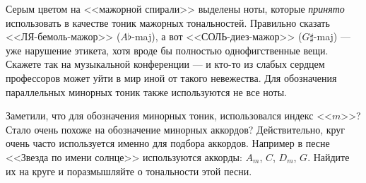 Серым цветом на <<мажорной спирали>> выделены ноты, которые \emph{принято} использовать в качестве тоник мажорных тональностей. Правильно сказать <<ЛЯ-бемоль-мажор>> ($A\flat$-maj), а вот <<СОЛЬ-диез-мажор>> ($G\sharp$-maj) --- уже нарушение этикета, хотя вроде бы полностью однофигственные вещи. Скажете так на музыкальной конференции --- и кто-то из слабых сердцем профессоров может уйти в мир иной от такого невежества. Для обозначения параллельных минорных тоник также используются не все ноты.

Заметили, что для обозначения минорных тоник, использовался индекс <<$m$>>? Стало очень похоже на обозначение минорных аккордов? Действительно, круг очень часто используется именно для подбора аккордов. Например в песне <<Звезда по имени солнце>> используются аккорды: $A_m$, $C$, $D_m$, $G$. Найдите их на круге и поразмышляйте о тональности этой песни.

